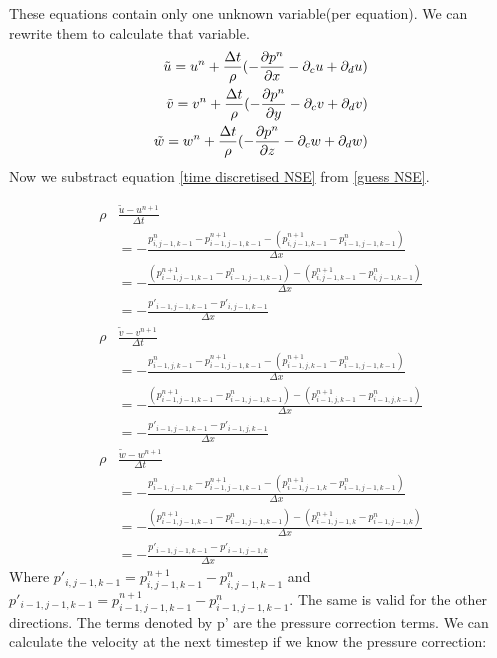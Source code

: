 \documentclass{article}
\begin{document}
These equations contain only one unknown variable(per equation). We can rewrite them to calculate that variable. 
\begin{equation}
  \begin{split}
  \tilde{u}=u^{n}+\frac{\Delta t}{\rho}(-\pdv{p^{n}}{x}-\partial _cu +\partial _du)\\
  \tilde{v}=v^{n}+\frac{\Delta t}{\rho}(-\pdv{p^{n}}{y}-\partial _cv +\partial _dv)\\
  \tilde{w}=w^{n}+\frac{\Delta t}{\rho}(-\pdv{p^{n}}{z}-\partial _cw +\partial _dw)
  \end{split}\label{velocity tilde}
\end{equation} 
Now we substract equation \ref{time discretised NSE} from \ref{guess NSE}.

\begin{equation}
	\begin{split}
			\rho & \frac{\tilde{u} - u^{n+1}}{\Delta t} \\ &= - \frac{p^{n}_{i,j-1,k-1}- p^{n+1}_{i-1,j-1,k-1}-(p^{n+1}_{i,j-1,k-1}- p^{n}_{i-1,j-1,k-1})}{\Delta x}\\
			&=-\frac{(p^{n+1}_{i-1,j-1,k-1}-p^{n}_{i-1,j-1,k-1})- 
			(p^{n+1}_{i,j-1,k-1}-p^{n}_{i,j-1,k-1})
		}{\Delta x}\\
			&=-\frac{p'_{i-1,j-1,k-1}-p'_{i,j-1,k-1}}{\Delta x}\\
\rho & \frac{\tilde{v} - v^{n+1}}{\Delta t} \\ &= - \frac{p^{n}_{i-1,j,k-1}- p^{n+1}_{i-1,j-1,k-1}-(p^{n+1}_{i-1,j,k-1}- p^{n}_{i-1,j-1,k-1})}{\Delta x}\\
			&=-\frac{(p^{n+1}_{i-1,j-1,k-1}-p^{n}_{i-1,j-1,k-1})- 
			(p^{n+1}_{i-1,j,k-1}-p^{n}_{i-1,j,k-1})
		}{\Delta x}\\
			&=-\frac{p'_{i-1,j-1,k-1}-p'_{i-1,j,k-1}}{\Delta x}\\
\rho & \frac{\tilde{w} - w^{n+1}}{\Delta t}  \\ &= - \frac{p^{n}_{i-1,j-1,k}- p^{n+1}_{i-1,j-1,k-1}-(p^{n+1}_{i-1,j-1,k}- p^{n}_{i-1,j-1,k-1})}{\Delta x}\\
			&=-\frac{(p^{n+1}_{i-1,j-1,k-1}-p^{n}_{i-1,j-1,k-1})-(p^{n+1}_{i-1,j-1,k}-p^{n}_{i-1,j-1,k})}{\Delta x}\\
			&=-\frac{p'_{i-1,j-1,k-1}-p'_{i-1,j-1,k}}{\Delta x}
\end{split}
\end{equation}
	Where \(p'_{i,j-1,k-1}=p^{n+1}_{i,j-1,k-1}-p^{n}_{i,j-1,k-1}\) and \(p'_{i-1,j-1,k-1}=p^{n+1}_{i-1,j-1,k-1}-p^{n}_{i-1,j-1,k-1}\).  The same is valid for the other directions. The terms denoted by p' are the pressure correction terms. We can calculate the velocity at the next timestep if we know the pressure correction:
\end{document}
